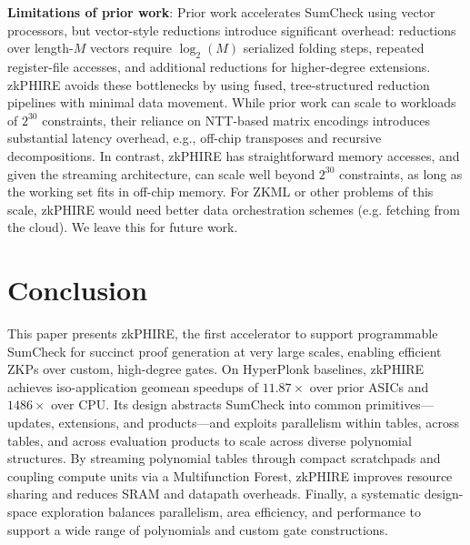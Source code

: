 \textbf{Limitations of prior work}:
Prior work \cite{nocap} accelerates SumCheck using vector processors, but vector-style reductions introduce significant overhead: reductions over length-$M$ vectors require $\log_2(M)$  serialized folding steps, repeated register-file accesses, and additional reductions for higher-degree extensions. zkPHIRE avoids these bottlenecks by using fused, tree-structured reduction pipelines with minimal data movement.
While prior work \cite{nocap, legozk} can scale to workloads of $2^{30}$ constraints, their reliance on NTT-based matrix encodings introduces substantial latency overhead, e.g., off-chip transposes and recursive decompositions.
In contrast, zkPHIRE has straightforward memory accesses, and given the streaming architecture, can scale well beyond $2^{30}$ constraints, as long as the working set fits in off-chip memory. For ZKML or other problems of this scale, zkPHIRE would need better data orchestration schemes (e.g. fetching from the cloud). We leave this for future work.

\section{Conclusion}
This paper presents zkPHIRE, the first accelerator to support programmable SumCheck for succinct proof generation at very large scales, enabling efficient ZKPs over custom, high-degree gates.
On HyperPlonk baselines, zkPHIRE achieves iso-application geomean speedups of 
$11.87\times$ over prior ASICs and $1486\times$ over CPU.
Its design abstracts SumCheck into common primitives—updates, extensions, and products—and exploits parallelism within tables, across tables, and across evaluation products to scale across diverse polynomial structures.
By streaming polynomial tables through compact scratchpads and coupling compute units via a Multifunction Forest, zkPHIRE improves resource sharing and reduces SRAM and datapath overheads. Finally, a systematic design-space exploration balances parallelism, area efficiency, and performance to support a wide range of polynomials and custom gate constructions.
